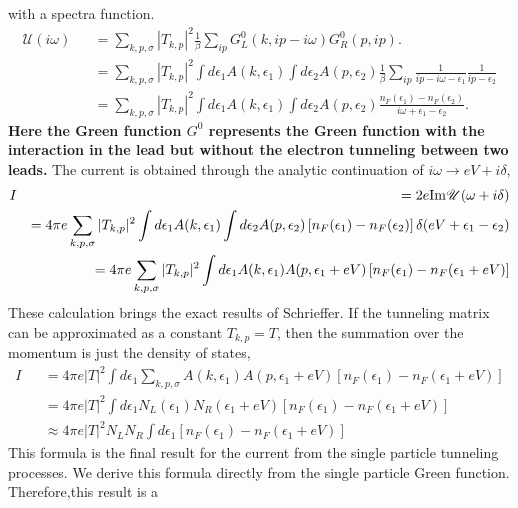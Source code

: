 \documentclass[11pt]{article}
\begin{document}
with a spectra function. \begin{eqnarray}
\mathscr{U}(i\omega) && =\sum_{k,p,\sigma}  |T_{k,p}|^2 \frac{1}{\beta } \sum_{ip}  G^0_L(k,ip-i\omega)  G^0_R(p,ip).
\\\nonumber
&& = \sum_{k,p,\sigma}  |T_{k,p}|^2   \int d\epsilon_1 A(k,\epsilon_1 )    \int d\epsilon_2 A(p,\epsilon_2)      \frac{1}{\beta } \sum_{ip} \frac{1}{ip - i\omega -\epsilon_1} \frac{1}{ip-\epsilon_2}
\\\nonumber
&& = \sum_{k,p,\sigma}  |T_{k,p}|^2   \int d\epsilon_1 A(k,\epsilon_1 )    \int d\epsilon_2 A(p,\epsilon_2)     \frac{n_F(\epsilon_1)- n_F(\epsilon_2)}{i\omega+\epsilon_1 - \epsilon_2}.
\end{eqnarray} \textbf{Here the Green function \(G^0\) represents the
Green function with the interaction in the lead but without the electron
tunneling between two leads.} The current is obtained through the
analytic continuation of \(i\omega \rightarrow eV+ i\delta\),
\begin{eqnarray}
I &&= 2e {\rm Im} \mathscr{U}(\omega +  i\delta)
\\\nonumber
&& = 4\pi e \sum_{k,p,\sigma}  |T_{k,p}|^2   \int d\epsilon_1 A(k,\epsilon_1 )    \int d\epsilon_2 A(p,\epsilon_2)     \left[ n_F(\epsilon_1)- n_F(\epsilon_2)\right] \delta(eV+\epsilon_1 - \epsilon_2) 
\\\nonumber
&& = 4\pi e \sum_{k,p,\sigma}  |T_{k,p}|^2   \int d\epsilon_1 A(k,\epsilon_1 )    A(p,\epsilon_1+ eV)     \left[ n_F(\epsilon_1)- n_F(\epsilon_1+ eV)\right]
\end{eqnarray} These calculation brings the exact results of Schrieffer.
If the tunneling matrix can be approximated as a constant \(T_{k,p}=T\),
then the summation over the momentum is just the density of states,
\begin{eqnarray}
I && = 4\pi e  |T|^2     \int d\epsilon_1  \sum_{k,p,\sigma}  A(k,\epsilon_1 )    A(p,\epsilon_1+ eV)     \left[ n_F(\epsilon_1)- n_F(\epsilon_1+eV)\right]
\nonumber \\ 
&& =  4\pi e  |T|^2     \int d\epsilon_1 N_L(\epsilon_1)    N_R (\epsilon_1+ eV)     \left[ n_F(\epsilon_1)- n_F(\epsilon_1+ eV)\right]
\\\nonumber
&& \approx  4\pi e  |T|^2  N_L N_R   \int d\epsilon_1   \left[ n_F(\epsilon_1)- n_F(\epsilon_1+ eV)\right]
\end{eqnarray} This formula is the final result for the current from the
single particle tunneling processes. We derive this formula directly
from the single particle Green function. Therefore,this result is a
\end{document}
